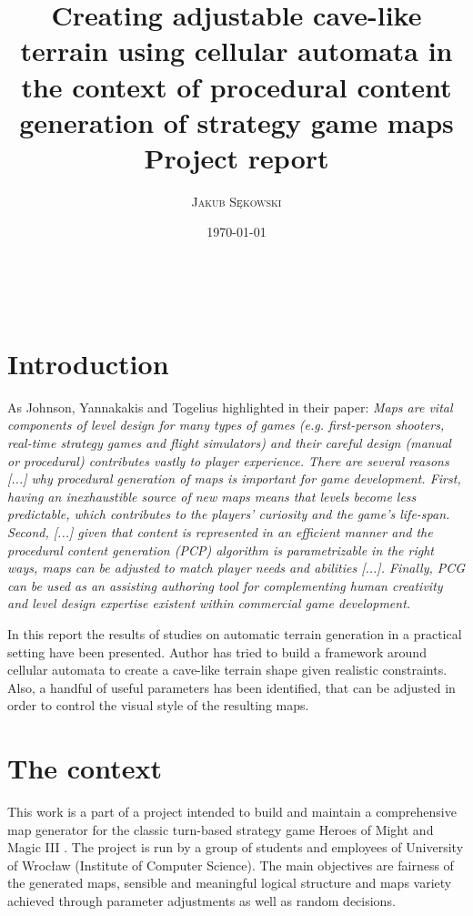 \documentclass[a4paper, 11pt]{article} %
\title{\Large \textbf{Creating adjustable cave-like terrain using cellular automata in the context of procedural content generation of strategy game maps} \\ %
\large{Project report}} %
\author{\textsc{Jakub Sękowski} %
\\{\textit{}}} %
\date{\today} %
\makeatletter
\renewcommand{\maketitle}{ %
\begin{flushright} %
{\LARGE\@title} %

\vspace{70pt} %

{\large\@author} %
\\\@date %

\vspace{40pt} %
\end{flushright}
}
\makeatother
\begin{document}
\maketitle %

\vspace{60pt}


\section*{Introduction}

As Johnson, Yannakakis and Togelius highlighted in their paper: \textit{Maps are vital components of level design for many types of games (e.g. first-person shooters, real-time strategy games and flight simulators) and their careful design (manual or procedural) contributes vastly to player experience. There are several reasons [...] why procedural generation of maps is important for game development. First, having an inexhaustible source of new maps means that levels become less predictable, which contributes to the players’ curiosity and the game’s life-span. Second, [...] given that content is represented in an efficient manner and the procedural content generation (PCP) algorithm is parametrizable in the right ways, maps can be adjusted to match player needs and abilities [...]. Finally, PCG can be used as an assisting authoring tool for complementing human creativity and level design expertise existent within commercial game development.} \cite{paper}

In this report the results of studies on automatic terrain generation in a practical setting have been presented. Author has tried to build a framework around cellular automata to create a cave-like terrain shape given realistic constraints. Also, a handful of useful parameters has been identified, that can be adjusted in order to control the visual style of the resulting maps.


\section*{The context}

This work is a part of a project intended to build and maintain a comprehensive map generator for the classic turn-based strategy game Heroes of Might and Magic III \cite{h3}. The project is run by a group of students and employees of University of Wrocław (Institute of Computer Science). The main objectives are fairness of the generated maps, sensible and meaningful logical structure and maps variety achieved through parameter adjustments as well as random decisions.
\end{document}
